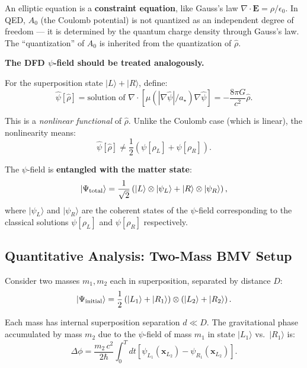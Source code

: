 \documentclass[11pt,a4paper]{article}
\begin{document}
An elliptic equation is a \textbf{constraint equation}, like Gauss's law $\nabla\cdot\mathbf{E} = \rho/\epsilon_0$. In QED, $A_0$ (the Coulomb potential) is not quantized as an independent degree of freedom --- it is determined by the quantum charge density through Gauss's law. The ``quantization'' of $A_0$ is inherited from the quantization of $\hat\rho$.

\textbf{The DFD $\psi$-field should be treated analogously.}

For the superposition state $|L\rangle + |R\rangle$, define:
\begin{equation}
\hat\psi[\hat\rho] = \text{solution of } \nabla\cdot[\mu(|\nabla\hat\psi|/a_\star)\nabla\hat\psi] = -\frac{8\pi G}{c^2}\hat\rho.
\end{equation}

This is a \emph{nonlinear functional} of $\hat\rho$. Unlike the Coulomb case (which is linear), the nonlinearity means:
\begin{equation}
\hat\psi[\hat\rho] \neq \frac{1}{2}\left(\psi[\rho_L] + \psi[\rho_R]\right).
\end{equation}

The $\psi$-field is \textbf{entangled with the matter state}:
\begin{equation}\label{eq:psi-entangled}
|\Psi_{\rm total}\rangle = \frac{1}{\sqrt{2}}\left(
|L\rangle \otimes |\psi_L\rangle + |R\rangle \otimes |\psi_R\rangle
\right),
\end{equation}
where $|\psi_L\rangle$ and $|\psi_R\rangle$ are the coherent states of the $\psi$-field corresponding to the classical solutions $\psi[\rho_L]$ and $\psi[\rho_R]$ respectively.

\subsection{Quantitative Analysis: Two-Mass BMV Setup}
\label{sec:BMV-analysis}

Consider two masses $m_1, m_2$ each in superposition, separated by distance $D$:
\begin{equation}
|\Psi_{\rm initial}\rangle = \frac{1}{2}\left(|L_1\rangle + |R_1\rangle\right)\otimes\left(|L_2\rangle + |R_2\rangle\right).
\end{equation}

Each mass has internal superposition separation $d \ll D$. The gravitational phase accumulated by mass $m_2$ due to the $\psi$-field of mass $m_1$ in state $|L_1\rangle$ vs.\ $|R_1\rangle$ is:
\begin{equation}\label{eq:phase-diff}
\Delta\phi = \frac{m_2\,c^2}{2\hbar}\int_0^T dt\left[\psi_{L_1}(\mathbf{x}_{L_2}) - \psi_{R_1}(\mathbf{x}_{L_2})\right].
\end{equation}
\end{document}
